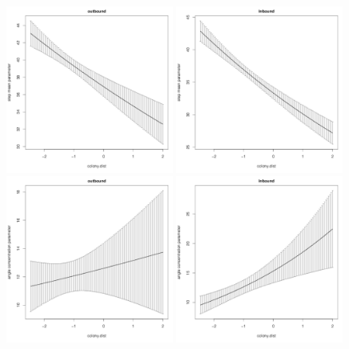 \documentclass[12pt]{article}\usepackage[]{graphicx}\usepackage[]{color}
\begin{document}
\begin{figure}[htbp]
  \centering
  \includegraphics[width=0.49\textwidth]{plot_sesResults001.pdf}
  \includegraphics[width=0.49\textwidth]{plot_sesResults003.pdf}\\
  \includegraphics[width=0.49\textwidth]{plot_sesResults007.pdf}
  \includegraphics[width=0.49\textwidth]{plot_sesResults009.pdf}\\

\end{figure}
\end{document}
